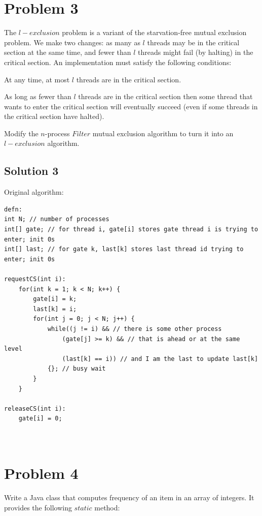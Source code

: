 \documentclass{article}
\begin{document}
\pagebreak
\section{Problem 3}
The $l-exclusion$ problem is a variant of the starvation-free mutual exclusion problem. We make two changes: as many as $l$ threads may be in the critical section at the same time, and fewer than $l$ threads might fail (by halting) in the critical section. An implementation must satisfy the following conditions:

\begin{description}[font=\scshape\bfseries]
\item [$l-Exclusion$:] At any time, at most $l$ threads are in the critical section.
\item [$l-Starvation-Freedom$:] As long as fewer than $l$ threads are in the critical section then some thread that wants to enter the critical section will eventually succeed (even if some threads in the critical section have halted).
\end{description}

Modify the $n$-process $Filter$ mutual exclusion algorithm to turn it into an $l-exclusion$ algorithm.

\subsection{Solution 3}
Original algorithm:

\begin{lstlisting}
defn:
int N; // number of processes
int[] gate; // for thread i, gate[i] stores gate thread i is trying to enter; init 0s
int[] last; // for gate k, last[k] stores last thread id trying to enter; init 0s

requestCS(int i):
	for(int k = 1; k < N; k++) {
		gate[i] = k;
		last[k] = i;
		for(int j = 0; j < N; j++) {
			while((j != i) && // there is some other process
				(gate[j] >= k) && // that is ahead or at the same level
				(last[k] == i)) // and I am the last to update last[k]
			{}; // busy wait
		}
	}
	
releaseCS(int i):
	gate[i] = 0;



\end{lstlisting}





\pagebreak
\section{Problem 4}
Write a Java class that computes frequency of an item in an array of integers. It provides the following $static$ method:
\end{document}
